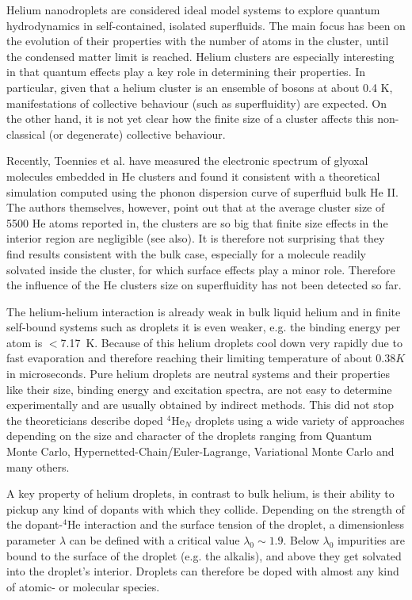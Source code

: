 		Helium nanodroplets are considered ideal model systems to explore quantum hydrodynamics in self-contained, isolated superfluids. The main focus has been on the evolution of their properties with the number of atoms in the cluster, until the condensed matter limit is reached. Helium clusters are especially interesting in that quantum effects play a key role in determining their properties. In particular, given that a helium cluster is an ensemble of bosons at about 0.4 K\citep{Brink1990,Hartmann1995}, manifestations of collective behaviour (such as superfluidity) are expected. On the other hand, it is not yet clear how the finite size of a cluster affects this non-classical (or degenerate) collective behaviour.

		Recently, Toennies et al.\citep{Hartmann1996} have measured the electronic spectrum of glyoxal molecules embedded in He clusters and found it consistent with a theoretical simulation computed using the phonon dispersion curve of superfluid bulk He II. The authors themselves, however, point out that at the average cluster size of 5500 He atoms reported in, the clusters are so big that finite size effects in the interior region are negligible (see also). It is therefore not surprising that they find results consistent with the bulk case, especially for a molecule readily solvated inside the cluster, for which surface effects play a minor role. Therefore the influence of the He clusters size on superfluidity has not been detected so far.
		
		The helium-helium interaction is already weak in bulk liquid helium and in finite self-bound systems such as droplets it is even weaker, e.g. the binding energy per atom is $<$7.17~K. Because of this helium droplets cool down very rapidly due to fast evaporation and therefore reaching their limiting temperature of about $0.38\unit{K}$ in microseconds. Pure helium droplets are neutral systems and their properties like their size, binding energy and excitation spectra, are not easy to determine experimentally and are usually obtained by indirect methods. This did not stop the theoreticians describe doped $^4$He$_N$ droplets using a wide variety of approaches depending on the size and character of the droplets ranging from Quantum Monte Carlo, Hypernetted-Chain/Euler-Lagrange\citep{Krotscheck2001}, Variational Monte Carlo\citep{Gartner2018} and many others.
		
		A key property of helium droplets, in contrast to bulk helium, is their ability to pickup any kind of dopants with which they collide. Depending on the strength of the dopant-$^4$He interaction and the surface tension of the droplet, a dimensionless parameter $\lambda$ can be defined\citep{Anc95} with a critical value $\lambda_0\sim1.9$. Below $\lambda_0$ impurities are bound to the surface of the droplet (e.g. the alkalis), and above they get solvated into the droplet's interior. Droplets can therefore be doped with almost any kind of atomic- or molecular species. 
		
